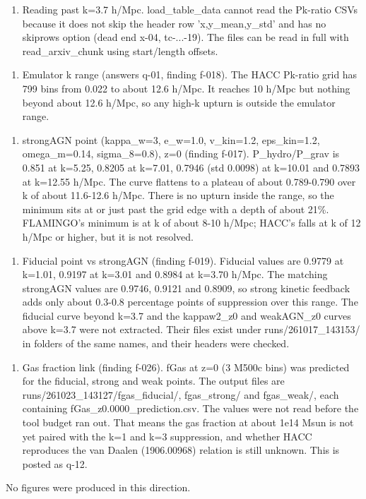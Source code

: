\documentclass[11pt,a4paper]{article}
\begin{document}
\begin{enumerate}
  \item Reading past k=3.7 h/Mpc. load\_table\_data cannot read the Pk-ratio CSVs because it does not skip the header row 'x,y\_mean,y\_std' and has no skiprows option (dead end x-04, tc-...-19). The files can be read in full with read\_arxiv\_chunk using start/length offsets.
\end{enumerate}
\begin{enumerate}
  \item Emulator k range (answers q-01, finding f-018). The HACC Pk-ratio grid has 799 bins from 0.022 to about 12.6 h/Mpc. It reaches 10 h/Mpc but nothing beyond about 12.6 h/Mpc, so any high-k upturn is outside the emulator range.
\end{enumerate}
\begin{enumerate}
  \item strongAGN point (kappa\_w=3, e\_w=1.0, v\_kin=1.2, eps\_kin=1.2, omega\_m=0.14, sigma\_8=0.8), z=0 (finding f-017). P\_hydro/P\_grav is 0.851 at k=5.25, 0.8205 at k=7.01, 0.7946 (std 0.0098) at k=10.01 and 0.7893 at k=12.55 h/Mpc. The curve flattens to a plateau of about 0.789-0.790 over k of about 11.6-12.6 h/Mpc. There is no upturn inside the range, so the minimum sits at or just past the grid edge with a depth of about 21\%. FLAMINGO's minimum is at k of about 8-10 h/Mpc; HACC's falls at k of 12 h/Mpc or higher, but it is not resolved.
\end{enumerate}
\begin{enumerate}
  \item Fiducial point vs strongAGN (finding f-019). Fiducial values are 0.9779 at k=1.01, 0.9197 at k=3.01 and 0.8984 at k=3.70 h/Mpc. The matching strongAGN values are 0.9746, 0.9121 and 0.8909, so strong kinetic feedback adds only about 0.3-0.8 percentage points of suppression over this range. The fiducial curve beyond k=3.7 and the kappaw2\_z0 and weakAGN\_z0 curves above k=3.7 were not extracted. Their files exist under runs/261017\_143153/ in folders of the same names, and their headers were checked.
\end{enumerate}
\begin{enumerate}
  \item Gas fraction link (finding f-026). fGas at z=0 (3 M500c bins) was predicted for the fiducial, strong and weak points. The output files are runs/261023\_143127/fgas\_fiducial/, fgas\_strong/ and fgas\_weak/, each containing fGas\_z0.0000\_prediction.csv. The values were not read before the tool budget ran out. That means the gas fraction at about 1e14 Msun is not yet paired with the k=1 and k=3 suppression, and whether HACC reproduces the van Daalen (1906.00968) relation is still unknown. This is posted as q-12.
\end{enumerate}
No figures were produced in this direction.
\end{document}
